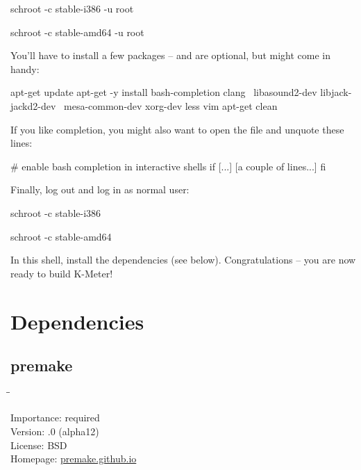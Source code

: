 \begin{Verbatim32}
  schroot -c stable-i386 -u root
\end{Verbatim32}

\begin{Verbatim64}
  schroot -c stable-amd64 -u root
\end{Verbatim64}

You'll have to install a few packages --  and 
are optional, but might come in handy:

\begin{VerbatimBoth}
  apt-get update
  apt-get -y install bash-completion clang \
    libasound2-dev libjack-jackd2-dev \
    mesa-common-dev xorg-dev less vim
  apt-get clean
\end{VerbatimBoth}

If you like  completion, you might also want to open the
file  and unquote these lines:

\begin{VerbatimBoth}
  # enable bash completion in interactive shells
  if [...]
    [a couple of lines...]
  fi
\end{VerbatimBoth}

Finally, log out and log in as normal user:

\begin{Verbatim32}
  schroot -c stable-i386
\end{Verbatim32}

\begin{Verbatim64}
  schroot -c stable-amd64
\end{Verbatim64}

In this  shell, install the dependencies (see below).
Congratulations -- you are now ready to build K-Meter!

\section{Dependencies}

\subsection{premake}
\label{sec:dependencies_premake}

\begin{tabbing}
  \hspace*{6em}\=\=\kill

  Importance:  \> required \\
  Version:     .0 (alpha12) \\
  License:     \> BSD \\
  Homepage:    \> \href{https://premake.github.io/}{premake.github.io}
\end{tabbing}

